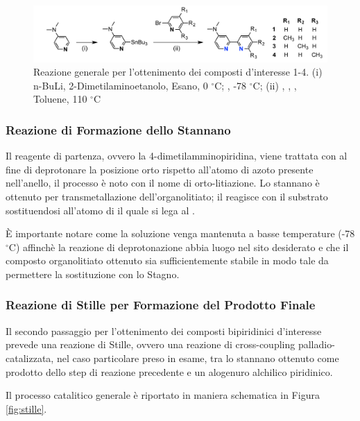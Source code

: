 \documentclass[a4paper, 12pt]{article}
\begin{document}
\begin{figure}[H]
	\centering
	\includegraphics[width=\linewidth]{immagini/rea_g.png}
	\caption{Reazione generale per l'ottenimento dei composti d'interesse 1-4. (i) n-BuLi, 2-Dimetilaminoetanolo, Esano, 0 $^\circ$C; , -78 $^\circ$C; (ii) , , , Toluene, 110 $^\circ$C }
	\label{fig:rea_g}
\end{figure}

\subsubsection{Reazione di Formazione dello Stannano }
Il reagente di partenza, ovvero la 4-dimetilamminopiridina, viene trattata con  al fine di deprotonare la posizione orto rispetto all'atomo di azoto presente nell'anello, il processo è noto con il nome di orto-litiazione. Lo stannano è ottenuto per transmetallazione dell'organolitiato; il  reagisce con il substrato sostituendosi all'atomo di  il quale si lega al .

È importante notare come la soluzione venga mantenuta a basse temperature (-78 $^\circ$C) affinchè la reazione di deprotonazione abbia luogo nel sito desiderato e che il composto organolitiato ottenuto sia sufficientemente stabile in modo tale da permettere la sostituzione con lo Stagno.

\subsubsection{Reazione di Stille per Formazione del Prodotto Finale}
Il secondo passaggio per l'ottenimento dei composti bipiridinici d'interesse prevede una reazione di Stille, ovvero una reazione di cross-coupling palladio-catalizzata, nel caso particolare preso in esame, tra lo stannano ottenuto come prodotto dello step di reazione precedente e un alogenuro alchilico piridinico.\cite{clayden_organic_2012}

Il processo catalitico generale è riportato in maniera schematica in Figura \ref{fig:stille}.
\end{document}
